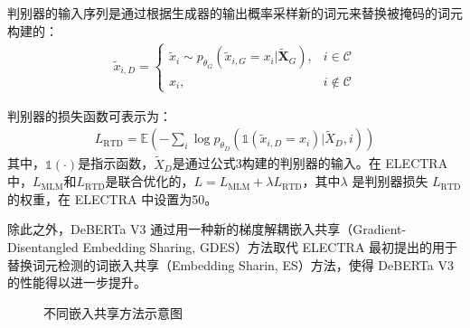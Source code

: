 判别器的输入序列是通过根据生成器的输出概率采样新的词元来替换被掩码的词元构建的：
\begin{align} 
\tilde{x}_{i,D} = \begin{cases} \tilde{x}_{i} \sim p_{\theta_G}(\tilde{x}_{i,G} = x_i|\tilde{\mathbf{X}}_G), & i \in \mathcal{C} \\ x_i, & i \notin \mathcal{C} \end{cases}
\end{align}

判别器的损失函数可表示为：
\begin{align}
L_{\text{RTD}} = \mathbb{E} \left( - \sum_{i} \log p_{\theta_D} \left( \mathbb{1}(\tilde{x}_{i,D} = x_i)|\tilde{X}_D, i \right) \right) 
\end{align}
其中，$\mathbb{1}(\cdot)$是指示函数，$\tilde{X}_D$是通过公式3构建的判别器的输入。在 ELECTRA 中，$L_{\text{MLM}}$和$L_{\text{RTD}}$是联合优化的，$L = L_{\text{MLM}} + \lambda L_{\text{RTD}}$，其中$\lambda$ 是判别器损失 $L_{\text{RTD}}$ 的权重，在 ELECTRA 中设置为50。 

除此之外，DeBERTa V3 通过用一种新的梯度解耦嵌入共享（Gradient-Disentangled Embedding Sharing, GDES）方法取代 ELECTRA 最初提出的用于替换词元检测的词嵌入共享（Embedding Sharin, ES）方法，使得 DeBERTa V3 的性能得以进一步提升。

\begin{figure}[htbp]
\centering  
{}
\hfill
{}
\hfill
{}
\caption{不同嵌入共享方法示意图}
\label{fig:es}
\end{figure}

